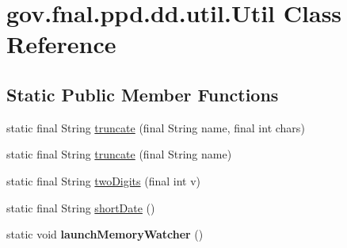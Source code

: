 \hypertarget{classgov_1_1fnal_1_1ppd_1_1dd_1_1util_1_1Util}{\section{gov.\-fnal.\-ppd.\-dd.\-util.\-Util Class Reference}
\label{classgov_1_1fnal_1_1ppd_1_1dd_1_1util_1_1Util}
}
\subsection*{Static Public Member Functions}
\begin{DoxyCompactItemize}
\item 
static final String \hyperlink{classgov_1_1fnal_1_1ppd_1_1dd_1_1util_1_1Util_a500e645950d17c59b68a157876f215c3}{truncate} (final String name, final int chars)
\item 
static final String \hyperlink{classgov_1_1fnal_1_1ppd_1_1dd_1_1util_1_1Util_ac1dda85f618a69dcf108f4ac5ae5bfd0}{truncate} (final String name)
\item 
static final String \hyperlink{classgov_1_1fnal_1_1ppd_1_1dd_1_1util_1_1Util_abd168ecd415159fe699847769f907ccc}{two\-Digits} (final int v)
\item 
static final String \hyperlink{classgov_1_1fnal_1_1ppd_1_1dd_1_1util_1_1Util_ae4d9723ca0fda1629427bfee39d9c47e}{short\-Date} ()
\item 
\hypertarget{classgov_1_1fnal_1_1ppd_1_1dd_1_1util_1_1Util_aceba274f9fff7a6d4022d977f27e1a89}{static void {\bfseries launch\-Memory\-Watcher} ()}\label{classgov_1_1fnal_1_1ppd_1_1dd_1_1util_1_1Util_aceba274f9fff7a6d4022d977f27e1a89}


\end{DoxyCompactItemize}
